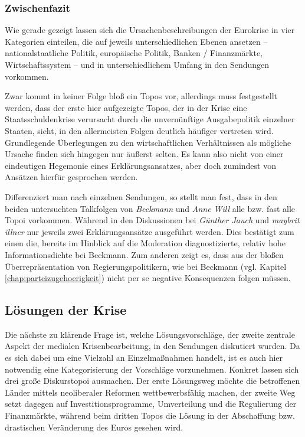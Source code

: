 \subsubsection{Zwischenfazit}

Wie gerade gezeigt lassen sich die Ursachenbeschreibungen der Eurokrise in vier Kategorien einteilen, die auf jeweils unterschiedlichen Ebenen ansetzen – nationalstaatliche Politik, europäische Politik, Banken / Finanzmärkte, Wirtschaftssystem – und in unterschiedlichem Umfang in den Sendungen vorkommen.

Zwar kommt in keiner Folge bloß ein Topos vor, allerdings muss festgestellt werden, dass der erste hier aufgezeigte Topos, der in der Krise eine Staatsschuldenkrise verursacht durch die unvernünftige Ausgabepolitik einzelner Staaten, sieht, in den allermeisten Folgen deutlich häufiger vertreten wird. Grundlegende Überlegungen zu den wirtschaftlichen Verhältnissen als mögliche Ursache finden sich hingegen nur äußerst selten. Es kann also nicht von einer eindeutigen Hegemonie eines Erklärungsansatzes, aber doch zumindest von Ansätzen hierfür gesprochen werden.

Differenziert man nach einzelnen Sendungen, so stellt man fest, dass in den beiden untersuchten Talkfolgen von \textit{Beckmann} und \textit{Anne Will} alle bzw. fast alle Topoi vorkommen. Während in den Diskussionen bei \textit{Günther Jauch} und \textit{maybrit illner} nur jeweils zwei Erklärungsansätze ausgeführt werden. Dies bestätigt zum einen die, bereits im Hinblick auf die Moderation diagnostizierte, relativ hohe Informationsdichte bei Beckmann. Zum anderen zeigt es, dass aus der bloßen Überrepräsentation von Regierungspolitikern, wie bei Beckmann (vgl. Kapitel \vref{chap:parteizugehoerigkeit}) nicht per se negative Konsequenzen folgen müssen.

\subsection{Lösungen der Krise}

Die nächste zu klärende Frage ist, welche Lösungsvorschläge, der zweite zentrale Aspekt der medialen Krisenbearbeitung, in den Sendungen diskutiert wurden. Da es sich dabei um eine Vielzahl an Einzelmaßnahmen handelt, ist es auch hier notwendig eine Kategorisierung der Vorschläge vorzunehmen. Konkret lassen sich drei große Diskurstopoi ausmachen. Der erste Lösungsweg möchte die betroffenen Länder mittels neoliberaler Reformen wettbewerbsfähig machen, der zweite Weg setzt dagegen auf Investitionsprogramme, Umverteilung und die Regulierung der Finanzmärkte, während beim dritten Topos die Lösung in der Abschaffung bzw. drastischen Veränderung des Euros gesehen wird.

